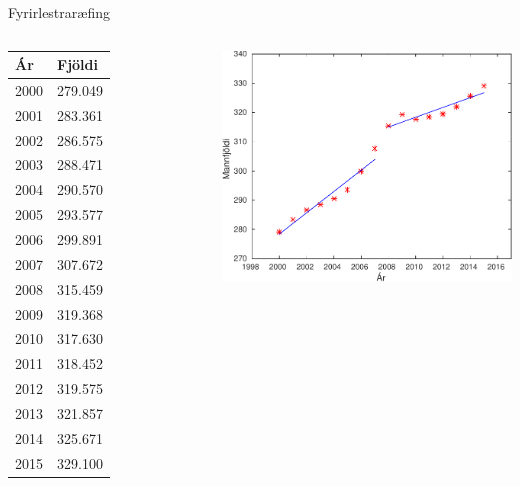 \documentclass{beamer}
\begin{document}
\begin{frame}{Fyrirlestraræfing}
\begin{columns}
\scriptsize
\begin{tabular}{ll}
\toprule
Ár&Fjöldi\\
\midrule
2000&279.049\\
2001&283.361\\
2002&286.575\\
2003&288.471\\
2004&290.570\\
2005&293.577\\
2006&299.891\\
2007&307.672\\
2008&315.459\\
2009&319.368\\
2010&317.630\\
2011&318.452\\
2012&319.575\\
2013&321.857\\
2014&325.671\\
2015&329.100\\
\bottomrule
\end{tabular}

\includegraphics[width=\linewidth]{Pics/kreppa}
\end{columns}
\end{frame}
\end{document}
